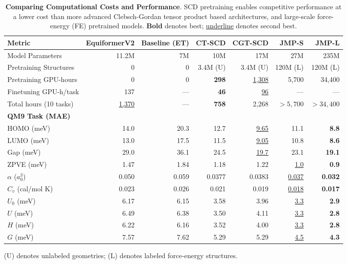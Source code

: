 \begin{table}[t]
\centering
\caption{\textbf{Comparing Computational Costs and Performance}. SCD pretraining enables competitive performance at a lower cost than more advanced Clebsch-Gordan tensor product based architectures, and large-scale force-energy (FE) pretrained models. \textbf{Bold} denotes best; \underline{underline} denotes second best.
}
\label{tab:scd_vs_jmp_qm9}
\small
\begin{tabular*}{\textwidth}{@{\extracolsep{\fill}}l r r r r r r}
\toprule
\textbf{Metric} & \textbf{EquiformerV2} & \textbf{Baseline (ET)} & \textbf{CT-SCD} & \textbf{CGT-SCD} & \textbf{JMP-S} & \textbf{JMP-L} \\
\midrule
Model Parameters & 11.2M & 7M & 10M & 17M & 27M & 235M \\
Pretraining Structures & 0 & 0 & 3.4M (U) & 3.4M (U) & 120M (L) & 120M (L) \\
Pretraining GPU-hours & 0 & 0 & \textbf{298} & \underline{1,308} & 5,700 & 34,400 \\
Finetuning GPU-h/task & 137 & --- & \textbf{46} & \underline{96} & --- & --- \\
Total hours (10 tasks) & \underline{1,370} & --- & \textbf{758} & 2,268 & $>5,700$ & $>34,400$ \\
\midrule
\textbf{QM9 Task (MAE)} & & & & & & \\
\midrule
HOMO (meV) & 14.0 & 20.3 & 12.7 & \underline{9.65} & 11.1 & \textbf{8.8} \\
LUMO (meV) & 13.0 & 17.5 & 11.5 & \underline{9.05} & 10.8 & \textbf{8.6} \\
Gap (meV) & 29.0 & 36.1 & 24.5 & \underline{19.7} & 23.1 & \textbf{19.1} \\
ZPVE (meV) & 1.47 & 1.84 & 1.18 & 1.22 & \underline{1.0} & \textbf{0.9} \\
$\alpha$ ($a_0^3$) & 0.050 & 0.059 & 0.0377 & 0.0383 & \underline{0.037} & \textbf{0.032} \\
$C_v$ (cal/mol K) & 0.023 & 0.026 & 0.021 & 0.019 & \underline{0.018} & \textbf{0.017} \\
$U_0$ (meV) & 6.17 & 6.15 & 3.58 & 3.96 & \underline{3.3} & \textbf{2.9} \\
$U$ (meV) & 6.49 & 6.38 & 3.50 & 4.11 & \underline{3.3} & \textbf{2.8} \\
$H$ (meV) & 6.22 & 6.16 & 3.52 & 4.00 & \underline{3.3} & \textbf{2.8} \\
$G$ (meV) & 7.57 & 7.62 & 5.29 & 5.29 & \underline{4.5} & \textbf{4.3} \\
\bottomrule
\end{tabular*}
\vspace{0.25em}
\flushleft\footnotesize (U) denotes unlabeled geometries; (L) denotes labeled force-energy structures.
\end{table}